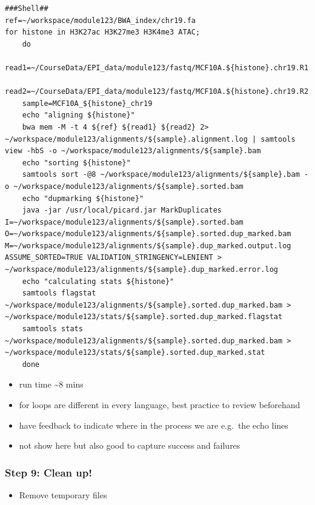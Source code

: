 \documentclass[
]{book}
\providecommand{\tightlist}{%
  \setlength{\itemsep}{0pt}\setlength{\parskip}{0pt}}
\begin{document}
\begin{verbatim}
###Shell##
ref=~/workspace/module123/BWA_index/chr19.fa
for histone in H3K27ac H3K27me3 H3K4me3 ATAC;
    do
    read1=~/CourseData/EPI_data/module123/fastq/MCF10A.${histone}.chr19.R1.fastq.gz
    read2=~/CourseData/EPI_data/module123/fastq/MCF10A.${histone}.chr19.R2.fastq.gz
    sample=MCF10A_${histone}_chr19
    echo "aligning ${histone}"
    bwa mem -M -t 4 ${ref} ${read1} ${read2} 2> ~/workspace/module123/alignments/${sample}.alignment.log | samtools view -hbS -o ~/workspace/module123/alignments/${sample}.bam
    echo "sorting ${histone}"
    samtools sort -@8 ~/workspace/module123/alignments/${sample}.bam -o ~/workspace/module123/alignments/${sample}.sorted.bam
    echo "dupmarking ${histone}"
    java -jar /usr/local/picard.jar MarkDuplicates I=~/workspace/module123/alignments/${sample}.sorted.bam O=~/workspace/module123/alignments/${sample}.sorted.dup_marked.bam M=~/workspace/module123/alignments/${sample}.dup_marked.output.log ASSUME_SORTED=TRUE VALIDATION_STRINGENCY=LENIENT > ~/workspace/module123/alignments/${sample}.dup_marked.error.log
    echo "calculating stats ${histone}"
    samtools flagstat ~/workspace/module123/alignments/${sample}.sorted.dup_marked.bam > ~/workspace/module123/stats/${sample}.sorted.dup_marked.flagstat
    samtools stats ~/workspace/module123/alignments/${sample}.sorted.dup_marked.bam > ~/workspace/module123/stats/${sample}.sorted.dup_marked.stat
    done
\end{verbatim}

\begin{itemize}
\tightlist
\item
  run time \textasciitilde8 mins
\item
  for loops are different in every language, best practice to review beforehand
\item
  have feedback to indicate where in the process we are e.g.~the echo lines
\item
  not show here but also good to capture success and failures
\end{itemize}

\subsubsection{Step 9: Clean up!}\label{step-9-clean-up}

\begin{itemize}
\tightlist
\item
  Remove temporary files
\end{itemize}
\end{document}
